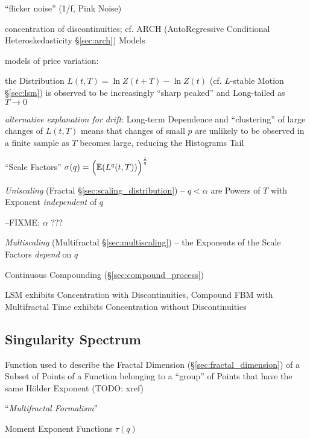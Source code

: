 ``flicker noise'' (1/f, Pink Noise)

concentration of discontinuities; cf. ARCH (AutoRegressive Conditional
Heteroskedasticity \S\ref{sec:arch}) Models

models of price variation:

the Distribution $L(t, T) = \ln Z(t + T) - \ln Z(t)$ (cf. $L$-stable Motion
\S\ref{sec:lsm}) is observed to be increasingly ``sharp peaked'' and Long-tailed
as $T \to 0$

\emph{alternative explanation for drift}: Long-term Dependence and
``clustering'' of large changes of $L(t, T)$ means that changes of small $p$ are
unlikely to be observed in a finite sample as $T$ becomes large, reducing the
Histograms Tail

``Scale Factors'' $\sigma(q) = \Big(\mathbb{E}(L^q(t, T))\Big)^{\frac{1}{q}}$

\emph{Uniscaling} (Fractal \S\ref{sec:scaling_distribution}) -- $q < \alpha$ are
Powers of $T$ with Exponent \emph{independent} of $q$

--FIXME: $\alpha$ ???

\emph{Multiscaling} (Multifractal \S\ref{sec:multiscaling}) -- the Exponents of
the Scale Factors \emph{depend} on $q$

Continuous Compounding (\S\ref{sec:compound_process})

LSM exhibits Concentration with Discontinuities, Compound FBM with Multifractal
Time exhibits Concentration without Discontinuities



\subsection{Singularity Spectrum}\label{sec:singularity_spectrum}

Function used to describe the Fractal Dimension (\S\ref{sec:fractal_dimension})
of a Subset of Points of a Function belonging to a ``group'' of Points that have
the same H\"older Exponent (TODO: xref)

``\emph{Multifractal Formalism}''

Moment Exponent Functions $\tau(q)$
